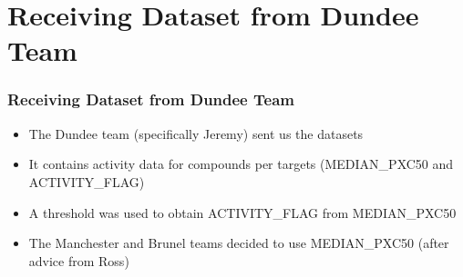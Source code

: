 \documentclass[compress]{beamer}
\begin{document}

\section{Receiving Dataset from Dundee Team}
\begin{frame}
\frametitle{Receiving Dataset from Dundee Team} 
\begin{itemize}%
 \item The Dundee team (specifically Jeremy) sent us the datasets
 \item It contains activity data for compounds per targets (MEDIAN\_PXC50 and ACTIVITY\_FLAG)
 \item A threshold was used to obtain ACTIVITY\_FLAG from MEDIAN\_PXC50
 \item The Manchester and Brunel teams decided to use MEDIAN\_PXC50 (after advice from Ross)
\end{itemize}
\end{frame}
\end{document}
